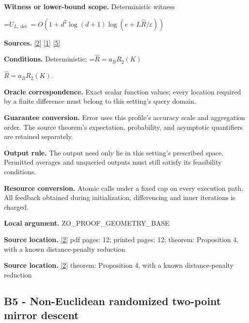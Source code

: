\documentclass[10pt,a4paper]{article}
\newcommand{\AtlasMath}[1]{\par\begingroup\centering\setbox0=\hbox{$\displaystyle #1$}\ifdim\wd0>1.4\linewidth\typeout{ATLAS WIDE FORMULA: \the\wd0}\fi\ifdim\wd0>\linewidth\resizebox{\linewidth}{!}{\box0}\else\box0\fi\par\endgroup}
\newcommand{\AtlasInlineMath}[1]{\begingroup\setbox0=\hbox{$#1$}\ifdim\wd0>.4\linewidth\endgroup\AtlasMath{#1}\else\endgroup$#1$\fi}
\begin{document}
\textbf{Witness or lower-bound scope.} Deterministic witness



\AtlasMath{U_{L,\det}=O(1+d^2\log(d+1)\log(e+L\widehat{R}/\varepsilon))}


\textbf{Sources.} \href{https://arxiv.org/html/2607.16558v2}{[2]} \href{https://arxiv.org/html/2610.00345v1}{[1]} \href{https://www.mathnet.ru/php/archive.phtml?jrnid=mzm&option_lang=eng&paperid=1697&wshow=paper}{[5]}



\textbf{Conditions.} Deterministic; \AtlasInlineMath{\widehat{R}=a_BR_2(K)}.



\textbf{Oracle correspondence.} Exact scalar function values; every location required by a finite difference must belong to this setting's query domain.



\textbf{Guarantee conversion.} Error uses this profile's accuracy scale and aggregation order. The source theorem's expectation, probability, and asymptotic quantifiers are retained separately.



\textbf{Output rule.} The output need only lie in this setting's prescribed space. Permitted averages and unqueried outputs must still satisfy its feasibility conditions.



\textbf{Resource conversion.} Atomic calls under a fixed cap on every execution path. All feedback obtained during initialization, differencing and inner iterations is charged.



\textbf{Local argument.} ZO\_PROOF\_GEOMETRY\_BASE



\textbf{Source location.} \href{https://arxiv.org/html/2607.16558v2}{[2]} pdf pages: 12; printed pages: 12; theorem: Proposition 4, with a known distance-penalty reduction



\textbf{Source location.} \href{https://arxiv.org/html/2607.16558v2}{[2]} theorem: Proposition 4, with a known distance-penalty reduction



\subsection{B5 - Non-Euclidean randomized two-point mirror descent}
\end{document}

